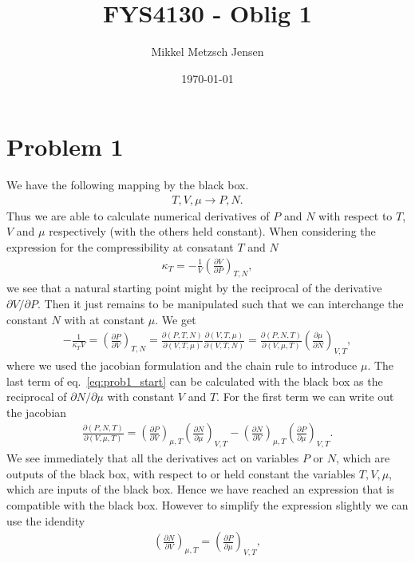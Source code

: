 \documentclass[reprint, amsmath, amssymb, aps, onecolumn]{revtex4-2}
\newcommand{\dd}[3]{\left(\frac{\partial #1}{\partial #2}\right)_{#3}}
\begin{document}
\title{FYS4130 - Oblig 1}


\author{Mikkel Metzsch Jensen}

\date{\today}
\maketitle
%
\section*{Problem 1}
\noindent We have the following mapping by the black box.
\begin{align*}
  T, V, \mu \rightarrow P, N.
\end{align*}
Thus we are able to calculate numerical derivatives of $P$ and $N$ with respect to $T$, $V$ and $\mu$ respectively (with the others held constant). When considering the expression for the compressibility at consatant $T$ and $N$
\begin{align*}
  \kappa_T = -\frac{1}{V} \dd{V}{P}{T,N},
\end{align*}
we see that a natural starting point might by the reciprocal of the derivative $\partial V/\partial P$. Then it just remains to be manipulated such that we can interchange the constant $N$ with at constant $\mu$. We get
\begin{align}
  - \frac{1}{\kappa_T V} = \dd{P}{V}{T,N} = \frac{\partial (P,T,N)}{\partial (V,T,\mu)} \frac{\partial (V,T,\mu)}{\partial (V,T,N)} = \frac{\partial (P,N,T)}{\partial (V,\mu,T)} \dd{\mu}{N}{V,T}, \label{eq:prob1_start}
\end{align}
where we used the jacobian formulation and the chain rule to introduce $\mu$. The last term of eq.~\eqref{eq:prob1_start} can be calculated with the black box as the reciprocal of $\partial N / \partial \mu$ with constant $V$ and $T$. For the first term we can write out the jacobian
\begin{align*}
  \frac{\partial (P,N,T)}{\partial (V,\mu,T)} = \dd{P}{V}{\mu,T} \dd{N}{\mu}{V,T} - \dd{N}{V}{\mu,T}\dd{P}{\mu}{V,T}.
\end{align*}
We see immediately that all the derivatives act on variables $P$ or $N$, which are outputs of the black box, with respect to or held constant the variables $T, V, \mu$, which are inputs of the black box. Hence we have reached an expression that is compatible with the black box. However to simplify the expression slightly we can use the idendity
\begin{align*}
  \dd{N}{V}{\mu,T} = \dd{P}{\mu}{V,T},
\end{align*}
\end{document}
